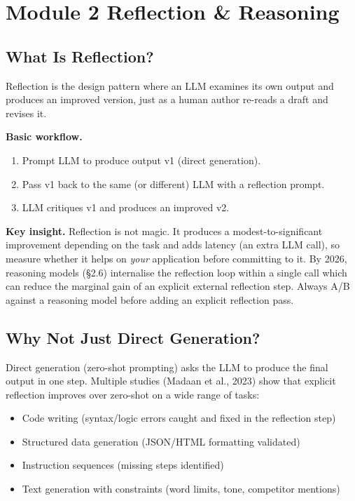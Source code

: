 \documentclass[a4paper,11pt]{article}
\begin{document}
\section{Module 2 \textemdash{} Reflection \& Reasoning}

\subsection{What Is Reflection?}

Reflection is the design pattern where an LLM examines its own output
and produces an improved version, just as a human author re-reads a
draft and revises it.

\textbf{Basic workflow.}
\begin{enumerate}[noitemsep, leftmargin=1.4em]
  \item Prompt LLM to produce output v1 (direct generation).
  \item Pass v1 back to the same (or different) LLM with a reflection
        prompt.
  \item LLM critiques v1 and produces an improved v2.
\end{enumerate}

\begin{ambercallout}
\textbf{Key insight.}
Reflection is not magic. It produces a modest-to-significant
improvement depending on the task and adds latency (an extra LLM
call), so measure whether it helps on \textit{your} application
before committing to it. By 2026, reasoning models (§2.6) internalise the
reflection loop within a single call \textemdash{} which can reduce
the marginal gain of an explicit external reflection step. Always
A/B against a reasoning model before adding an explicit reflection
pass.
\end{ambercallout}

\subsection{Why Not Just Direct Generation?}

Direct generation (zero-shot prompting) asks the LLM to produce the
final output in one step. Multiple studies (Madaan et al., 2023) show
that explicit reflection improves over zero-shot on a wide range of
tasks:

\begin{itemize}[noitemsep, leftmargin=1.2em]
  \item Code writing (syntax/logic errors caught and fixed in the
        reflection step)
  \item Structured data generation (JSON/HTML formatting validated)
  \item Instruction sequences (missing steps identified)
  \item Text generation with constraints (word limits, tone,
        competitor mentions)
\end{itemize}
\end{document}

